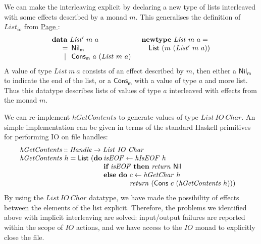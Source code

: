 \documentclass{jfp1}
\newcommand{\kw}[1]{\textbf{#1}}
\begin{document}
We can make the interleaving explicit by declaring a new type of lists
interleaved with some effects described by a monad $m$. This
generalises the definition of $\mathit{List_{io}}$ from
\hyperref[defn:listio]{Page \pageref*{defn:listio}}:
\begin{displaymath}
  \begin{array}{ll}
    \kw{data}~\mathit{List'}~m~a
    &
    \kw{newtype}~\mathit{List}~m~a = 
    \\
    \quad
    \begin{array}[t]{c@{\hspace{0.5em}}l}
      = & \mathsf{Nil_m} \\
      | & \mathsf{Cons_m}~a~(\mathit{List}~m~a) \\
    \end{array}
    &
    \quad \mathsf{List}~(m~(\mathit{List'}~m~a))
  \end{array}
\end{displaymath}
A value of type $\mathit{List}~m~a$ consists of an effect described by
$m$, then either a $\mathsf{Nil_m}$ to indicate the end of the list,
or a $\mathsf{Cons_m}$ with a value of type $a$ and more list. Thus
this datatype describes lists of values of type $a$ interleaved with
effects from the monad $m$.

We can re-implement $\mathit{hGetContents}$ to generate values of type
$\mathit{List}~\mathit{IO}~\mathit{Char}$. An simple implementation
can be given in terms of the standard Haskell primitives for
performing IO on file handles:
\begin{displaymath}
  \begin{array}{l}
  \mathit{hGetContents} :: \mathit{Handle} \to \mathit{List}~\mathit{IO}~\mathit{Char} \\
  \begin{array}{@{}l@{\hspace{0.2em}}l}
    \mathit{hGetContents}~h = \mathsf{List}~(\kw{do} & \mathit{isEOF} \leftarrow \mathit{hIsEOF}~h \\
    & \kw{if}~\mathit{isEOF}~\kw{then}~\mathit{return}~\mathsf{Nil} \\
    & \kw{else}~\kw{do}~
    \begin{array}[t]{@{}l}
      c \leftarrow \mathit{hGetChar}~h \\
      \mathit{return}~(\mathsf{Cons}~c~(\mathit{hGetContents}~h)))
    \end{array}
  \end{array}
\end{array}
\end{displaymath}
By using the $\mathit{List}~\mathit{IO}~\mathit{Char}$ datatype, we
have made the possibility of effects between the elements of the list
explicit. Therefore, the problems we identified above with implicit
interleaving are solved: input/output failures are reported within the
scope of $\mathit{IO}$ actions, and we have access to the
$\mathit{IO}$ monad to explicitly close the file.
\end{document}
